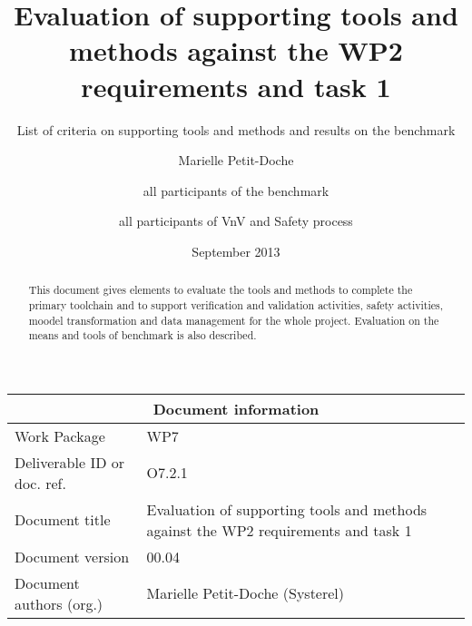\documentclass{template/openetcs_report}
\begin{document}
\frontmatter
{}




\title{Evaluation of supporting tools and methods against the WP2 requirements and task 1}

\subtitle{List of criteria on supporting tools and methods and results on the benchmark}

\date{September 2013}


\author{Marielle Petit-Doche}


\author{all participants of the benchmark}


\author{all participants of VnV  and Safety process}


 


\begin{abstract}
This document gives elements to evaluate the tools and methods to complete the primary toolchain and to support verification and validation activities, safety activities, moodel transformation and data management for the whole project.
 Evaluation on the means and tools of benchmark is also described.

\end{abstract}

\maketitle
\tableofcontents
\listoffiguresandtables
\newpage


\begin{tabular}{|p{4.4cm}|p{8.7cm}|}
\hline
\multicolumn{2}{|c|}{Document information} \\
\hline
Work Package &  WP7  \\
Deliverable ID or doc. ref. & O7.2.1\\
\hline
Document title & Evaluation of supporting tools and methods against the WP2 requirements and task 1 \\
Document version & 00.04 \\
Document authors (org.)  & Marielle Petit-Doche (Systerel)  \\
\hline
\end{tabular}
\end{document}
